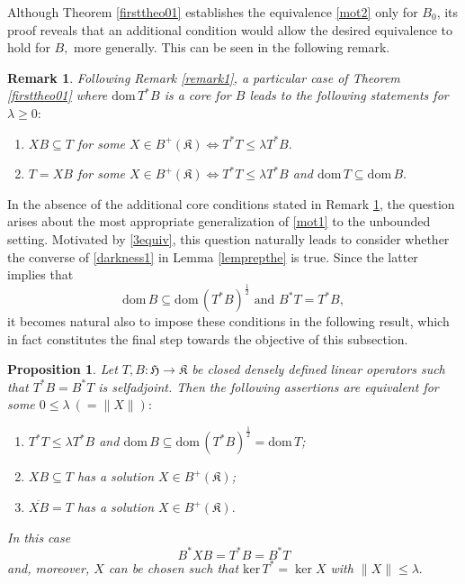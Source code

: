 \documentclass{amsart}
\newtheorem{proposition}[theorem]{Proposition}
\newtheorem{remark}[theorem]{Remark}
\newcommand{\n}{\|}
\newcommand{\ifaf}{\Leftrightarrow}
\newcommand{\h}{\mathfrak{H}}
\newcommand{\kk}{\mathfrak{K}}
\newcommand{\kerr}{\mathrm{ker}\,}
\newcommand{\D}{\mathrm{dom}\,}
\newcommand{\DT}{\mathrm{dom}\,T }
\newcommand{\DB}{\mathrm{dom}\,B }
\newcommand{\adj}{^*}
\newcommand{\tstar}{T^{*}}
\newcommand{\halftsb}{( T^*B)^{\frac{1}{2}}}
\newcommand{\inclu}{\subseteq}
\newcommand{\lplusk}{B^{+}(\kk)}
\numberwithin{equation}{section}
\renewcommand{\labelenumi}{(\arabic{enumi})}
\begin{document}
Although Theorem \ref{firsttheo01} establishes the equivalence \eqref{mot2} only for $B_0$, its proof reveals that an additional condition would allow the desired equivalence to hold for $B,$  more generally. This can be seen in the following remark.

\begin{remark}\label{remarko5ra}
\normalfont
  Following Remark \ref{remark1}, a particular case of Theorem \ref{firsttheo01} where  $\D \tstar B$ is a core for $B$ leads to the following statements for $\lambda \geq 0:$
\begin{enumerate}
  \item $ X B \inclu T $   for some $ X \in \lplusk \ifaf  T^* T  \leq \lambda \tstar B.$
  \item $T=X B$ for some $ X \in \lplusk \ifaf  T^* T  \leq \lambda \tstar B$ and $ \DT \inclu \D B.$
\end{enumerate}
\end{remark}


In the absence of the additional core conditions stated in Remark \ref{remarko5ra}, the question arises about the most appropriate generalization of \eqref{mot1} to the unbounded setting. Motivated by  \eqref{3equiv}, this question naturally leads to consider whether the converse of \eqref{darkness1} in  Lemma \ref{lemprepthe} is true. Since the latter implies that
$$
\DB \inclu \D \halftsb  \text{ and }   B\adj T = \tstar B,
$$
it becomes natural   also to impose these conditions in the following result, which in fact constitutes the final step towards the objective  of this subsection.

\begin{proposition} \label{sebestyenB}
   Let $T,B:\h \rightarrow \kk $ be closed densely defined linear operators such that $\tstar B=B\adj T $ is selfadjoint.  Then the following assertions are equivalent for some $0 \leq \lambda \ (  =\n X\n):$
   \begin{enumerate}\def\labelenumi{\rm(\roman{enumi})}
   \item   $T^* T  \leq \lambda \tstar B$  and $\DB \inclu \D \halftsb =\DT $;
   \item $ X B \inclu T$ has a solution $X \in \lplusk$;
     \item $\overline{X B} =T$ has a solution $X \in \lplusk.$
      \end{enumerate}
      In this case
     \begin{equation}\label{workfin2}
       B\adj X B =  \tstar B=B\adj T
      \end{equation}
      and, moreover, $X$ can be chosen such that $\kerr \tstar =\ker X$ with $\n X \n \leq \lambda.$
\end{proposition}
\end{document}
